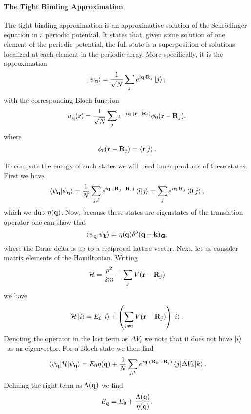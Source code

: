 \paragraph{The Tight Binding Approximation}
The tight binding approximation is an approximative solution of the Schrödinger equation in  a periodic potential. It states that, given some solution of one element of the periodic potential, the full state is a superposition of solutions localized at each element in the periodic array. More specifically, it is the approximation
\begin{align*}
	\ket{\psi_{\vb{q}}} = \frac{1}{\sqrt{N}}\sum\limits_{j}e^{i\vb{q}\cdot\vb{R}_{j}}\ket{j},
\end{align*}
with the corresponding Bloch function
\begin{align*}
	u_{\vb{q}}(\vb{r}) = \frac{1}{\sqrt{N}}\sum\limits_{j}e^{-i\vb{q}\cdot(\vb{r} - \vb{R}_{j})}\phi_{0}(\vb{r} - \vb{R}_{j}),
\end{align*}
where
\begin{align*}
	\phi_{0}(\vb{r} - \vb{R}_{j}) = \braket{\vb{r}}{j}.
\end{align*}

To compute the energy of such states we will need inner products of these states. First we have
\begin{align*}
	\braket{\psi_{\vb{q}}} = \frac{1}{N}\sum\limits_{j, l}e^{i\vb{q}\cdot(\vb{R}_{j} - \vb{R}_{l})}\braket{l}{j} = \sum\limits_{j}e^{i\vb{q}\cdot\vb{R}_{j}}\braket{0}{j},
\end{align*}
which we dub $\eta(\vb{q})$. Now, because these states are eigenstates of the translation operator one can show that
\begin{align*}
	\braket{\psi_{\vb{q}}}{\psi_{\vb{k}}} = \eta(\vb{q})\delta^{3}(\vb{q} - \vb{k})_{\vb{G}},
\end{align*}
where the Dirac delta is up to a reciprocal lattice vector. Next, let us consider matrix elements of the Hamiltonian. Writing
\begin{align*}
	\mathcal{H} = \frac{p^{2}}{2m} + \sum\limits_{j}V(\vb{r} - \vb{R}_{j})
\end{align*}
we have
\begin{align*}
	\mathcal{H}\ket{i} = E_{0}\ket{i} + \left(\sum\limits_{j\neq i}V(\vb{r} - \vb{R}_{j})\right)\ket{i}.
\end{align*}
Denoting the operator in the last term as $\Delta V_{i}$ we note that it does not have $\ket{i}$ as an eigenvector. For a Bloch state we then find
\begin{align*}
	\mel{\psi_{\vb{q}}}{\ensuremath{\mathcal{H}}}{\psi_{\vb{q}}} = E_{0}\eta(\vb{q}) + \frac{1}{N}\sum\limits_{j, k}e^{i\vb{q}\cdot(\vb{R}_{k} - \vb{R}_{j})}\mel{j}{\Delta V_{k}}{k}.
\end{align*}
Defining the right term as $\Lambda(\vb{q})$ we find
\begin{align*}
	E_{\vb{q}} = E_{0} + \frac{\Lambda(\vb{q})}{\eta(\vb{q})}.
\end{align*}

